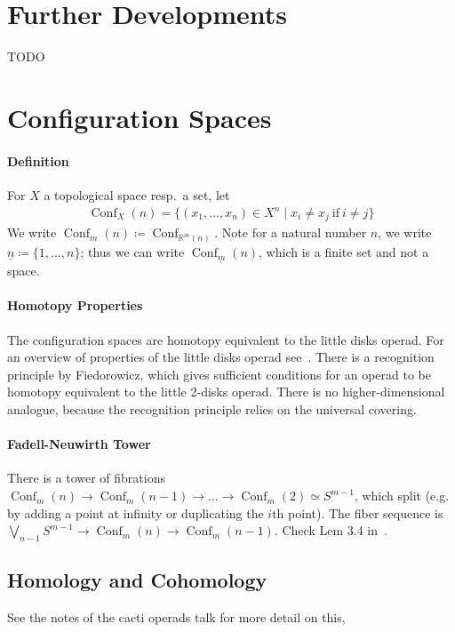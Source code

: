 \documentclass{scrartcl}
\theoremstyle{plain}
\theoremstyle{definition}
\newcommand{\R}{\mathbb R}
\newcommand{\defeq}{\coloneqq}
\DeclareMathOperator{\Conf}{Conf}
\begin{document}
\section{Further 
Developments}

TODO





\section{Configuration Spaces}

\paragraph{Definition} For $X$ a topological space resp.\ a set, let
\begin{align*}
    \Conf_X(n) = \{(x_1,\dots, x_n)\in X^n \mid x_i \neq x_j\ \text{if}\ i\neq j\}
\end{align*}
We write $\Conf_m(n) \coloneqq \Conf_{\R^m(n)}$. Note for a natural number $n$, we write $\underline n \defeq \{1, \dots, n\}$; thus we can write $\Conf_{\underline m}(n)$, which is a finite set and not a space. 

\paragraph{Homotopy Properties} The configuration spaces are homotopy equivalent to the little disks operad. For an overview of properties of the little disks operad see~\cite{fresse2017homotopy}. There is a recognition principle by Fiedorowicz, which gives sufficient conditions for an operad to be homotopy equivalent to the little 2-disks operad. There is no higher-dimensional analogue, because the recognition principle relies on the universal covering. 

\paragraph{Fadell-Neuwirth Tower} There is a tower of fibrations $\Conf_m(n) \to \Conf_m(n-1) \to \dots \to \Conf_m(2) \simeq S^{m-1}$, which split (e.g. by adding a point at infinity or duplicating the $i$th point). The fiber sequence is $\bigvee_{n-1} S^{m-1} \to \Conf_m(n) \to \Conf_m(n-1)$. Check Lem 3.4 in~\cite{sinha2010homology}. 

\subsection{Homology and Cohomology} 
See the notes of the cacti operads talk for more detail on this, 
\end{document}
